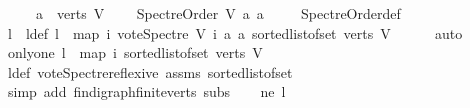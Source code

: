 \begin{isabellebody}
\ \ \ \ \ {\isachardoublequoteopen}a\ {\isasymin}\ verts\ V{\isachardoublequoteclose}\ \isanewline
\ \ \ {\isachardoublequoteopen}Spectre{\isacharunderscore}{\kern0pt}Order\ V\ a\ a{\isachardoublequoteclose}\ \isanewline
%
\isadelimproof
\ \ %
\endisadelimproof
%
\isatagproof
{}\isamarkupfalse%
\ Spectre{\isacharunderscore}{\kern0pt}Order{\isacharunderscore}{\kern0pt}def\ \isanewline
{}\isamarkupfalse%
\ {\isacharminus}{\kern0pt}\ \ \ \isanewline
\ \ \isamarkupfalse%
\ l\ \ l{\isacharunderscore}{\kern0pt}def{\isacharcolon}{\kern0pt}\ {\isachardoublequoteopen}l\ {\isacharequal}{\kern0pt}\ {\isacharparenleft}{\kern0pt}map\ {\isacharparenleft}{\kern0pt}{\isasymlambda}i{\isachardot}{\kern0pt}\ vote{\isacharunderscore}{\kern0pt}Spectre\ V\ i\ a\ a{\isacharparenright}{\kern0pt}\ {\isacharparenleft}{\kern0pt}sorted{\isacharunderscore}{\kern0pt}list{\isacharunderscore}{\kern0pt}of{\isacharunderscore}{\kern0pt}set\ {\isacharparenleft}{\kern0pt}verts\ V{\isacharparenright}{\kern0pt}{\isacharparenright}{\kern0pt}{\isacharparenright}{\kern0pt}{\isachardoublequoteclose}\isanewline
\ \ \ \ \isamarkupfalse%
\ auto\isanewline
\ \ \isamarkupfalse%
\ only{\isacharunderscore}{\kern0pt}one{\isacharcolon}{\kern0pt}\ {\isachardoublequoteopen}l\ {\isacharequal}{\kern0pt}\ {\isacharparenleft}{\kern0pt}map\ {\isacharparenleft}{\kern0pt}{\isasymlambda}i{\isachardot}{\kern0pt}{}{\isacharparenright}{\kern0pt}\ {\isacharparenleft}{\kern0pt}sorted{\isacharunderscore}{\kern0pt}list{\isacharunderscore}{\kern0pt}of{\isacharunderscore}{\kern0pt}set\ {\isacharparenleft}{\kern0pt}verts\ V{\isacharparenright}{\kern0pt}{\isacharparenright}{\kern0pt}{\isacharparenright}{\kern0pt}{\isachardoublequoteclose}\isanewline
\ \ \ \ \isamarkupfalse%
\ l{\isacharunderscore}{\kern0pt}def\ vote{\isacharunderscore}{\kern0pt}Spectre{\isacharunderscore}{\kern0pt}reflexive\ assms\ sorted{\isacharunderscore}{\kern0pt}list{\isacharunderscore}{\kern0pt}of{\isacharunderscore}{\kern0pt}set{\isacharparenleft}{\kern0pt}{}{\isacharparenright}{\kern0pt}\isanewline
\ \ \ \ \isamarkupfalse%
\ {\isacharparenleft}{\kern0pt}simp\ add{\isacharcolon}{\kern0pt}\ fin{\isacharunderscore}{\kern0pt}digraph{\isachardot}{\kern0pt}finite{\isacharunderscore}{\kern0pt}verts\ subs{\isacharparenright}{\kern0pt}\isanewline
\ \ \isamarkupfalse%
\ ne{\isacharcolon}{\kern0pt}\ {\isachardoublequoteopen}l\ {\isasymnoteq}\ {\isacharbrackleft}{\kern0pt}{\isacharbrackright}{\kern0pt}{\isachardoublequoteclose}\isanewline

\end{isabellebody}
